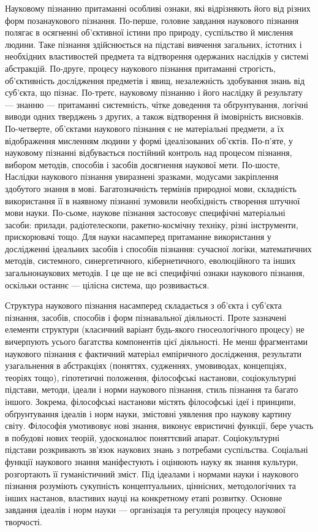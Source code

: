 Науковому пізнанню притаманні особливі ознаки, які відрізняють його від
різних форм позанаукового пізнання. По-перше, головне завдання наукового
пізнання полягає в осягненні об’єктивної істини про природу, суспільство й
мислення людини. Таке пізнання здійснюється на підставі вивчення загальних,
істотних і необхідних властивостей предмета та відтворення одержаних
наслідків у системі абстракцій. По-друге, процесу наукового пізнання
притаманні строгість, об’єктивність дослідження предметів і явищ,
незалежність здобування знань від суб’єкта, що пізнає. По-третє, науковому
пізнанню і його наслідку й результату --- знанню --- притаманні системність,
чітке доведення та обґрунтування, логічні виводи одних тверджень з других, а
також відтворення й імовірність висновків. По-четверте, об’єктами наукового
пізнання є не матеріальні предмети, а їх відображення мисленням людини у
формі ідеалізованих об’єктів. По-п’яте, у науковому пізнанні відбувається
постійний контроль над процесом пізнання, вибором методів, способів і засобів
досягнення наукової мети. По-шосте, Наслідки наукового пізнання увиразнені
зразками, модусами закріплення здобутого знання в мові. Багатозначність
термінів природної мови, складність використання її в наявному пізнанні
зумовили необхідність створення штучної мови науки. По-сьоме, наукове
пізнання застосовує специфічні матеріальні засоби: прилади, радіотелескопи,
ракетно-космічну техніку, різні інструменти, прискорювачі тощо. Для науки
насамперед притаманне використання у дослідженні ідеальних засобів і
способів пізнання: сучасної логіки, математичних методів, системного,
синергетичного, кібернетичного, еволюційного та інших загальнонаукових
методів. І це ще не всі специфічні ознаки наукового пізнання, оскільки останнє
--- цілісна система, що розвивається.

Структура наукового пізнання насамперед складається з об’єкта і суб’єкта
пізнання, засобів, способів і форм пізнавальної діяльності. Проте зазначені
елементи структури (класичний варіант будь-якого гносеологічного процесу)
не вичерпують усього багатства компонентів цієї діяльності. Не менш
фрагментами наукового пізнання є фактичний матеріал емпіричного
дослідження, результати узагальнення в абстракціях (поняттях, судженнях,
умовиводах, концепціях, теоріях тощо), гіпотетичні положення, філософські
настанови, соціокультурні підстави, методи, ідеали і норми наукового пізнання,
стиль пізнання та багато іншого. Зокрема, філософські настанови містять
філософські ідеї і принципи, обґрунтування ідеалів і норм науки, змістовні
уявлення про наукову картину світу. Філософія умотивовує нові знання,
виконує евристичні функції, бере участь в побудові нових теорій, удосконалює
поняттєвий апарат. Соціокультурні підстави розкривають зв’язок наукових
знань з потребами суспільства. Соціальні функції наукового знання
маніфестують і оцінюють науку як знання культури, розгортають її
гуманістичний зміст. Під ідеалами і нормами науки і наукового пізнання
розуміють сукупність концептуальних, ціннісних, методологічних та інших
настанов, властивих науці на конкретному етапі розвитку. Основне завдання
ідеалів і норм науки --- організація та регуляція процесу наукової творчості.

